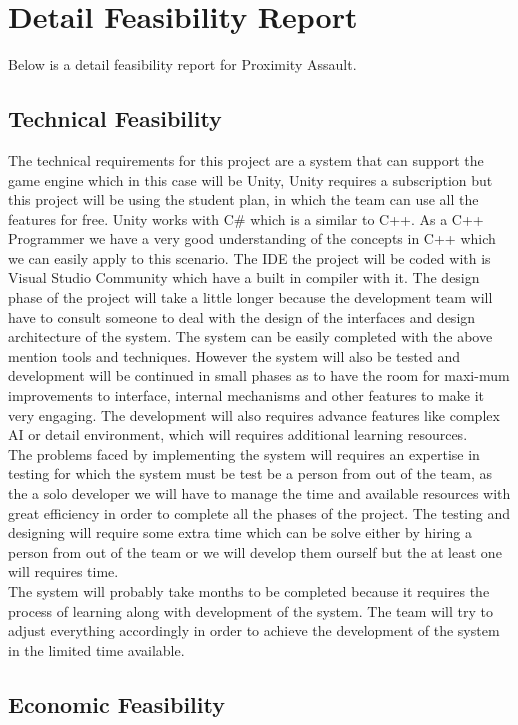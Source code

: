 \section{Detail Feasibility Report}
Below is a detail feasibility report for Proximity Assault.
\subsection{Technical Feasibility}
The technical requirements for this project are a system that can support the game engine which in this case will be Unity, Unity requires a subscription but this project will be using the student plan, in which the team can use all the features for free. Unity works with C\# which is a similar to C++. As a C++ Programmer we have a very good understanding of the concepts in C++ which we can easily apply to this scenario. The IDE the project will be coded with is Visual Studio Community which have a built in compiler with it.
The design phase of the project will take a little longer because the development team will have to consult someone to deal with the design of the interfaces and design architecture of the system.
The system can be easily completed with the above mention tools and techniques. However the system will also be tested and development will be continued in small phases as to have the room for maxi-mum improvements to interface, internal mechanisms and other features to make it very engaging.
The development will also requires advance features like complex AI or detail environment, which will requires additional learning resources.\\
The problems faced by implementing the system will requires an expertise in testing for which the system must be test be a person from out of the team, as the a solo developer we will have to manage the time and available resources with great efficiency in order to complete all the phases of the project. The testing and designing will require some extra time which can be solve either by hiring a person from out of the team or we will develop them ourself but the at least one will requires time. \\
The system will probably take months to be completed because it requires the process of learning along with development of the system. The team will try to adjust everything accordingly in order to achieve the development of the system in the limited time available.

\subsection{Economic Feasibility}


